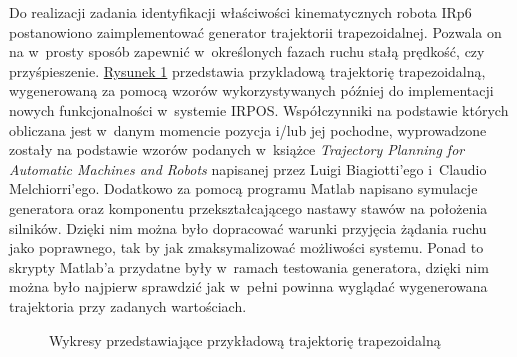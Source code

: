 \documentclass[a4paper, 12pt]{article}
\begin{document}
	Do realizacji zadania identyfikacji właściwości kinematycznych robota IRp6 postanowiono zaimplementować generator trajektorii trapezoidalnej. Pozwala on na w~prosty sposób zapewnić w~określonych fazach ruchu stałą prędkość, czy przyśpieszenie. \hyperref[fig:trajtrapez]{Rysunek 1} przedstawia przykladową trajektorię trapezoidalną, wygenerowaną za pomocą wzorów wykorzystywanych później do implementacji nowych funkcjonalności w~systemie IRPOS. Współczynniki na podstawie których obliczana jest w~danym momencie pozycja i/lub jej pochodne, wyprowadzone zostały na podstawie wzorów podanych w~książce \textit{Trajectory Planning for Automatic Machines and Robots} napisanej przez Luigi Biagiotti'ego i~Claudio Melchiorri'ego. Dodatkowo za pomocą programu Matlab napisano symulacje generatora oraz komponentu przekształcającego nastawy stawów na położenia silników. Dzięki nim można było dopracować warunki przyjęcia żądania ruchu jako poprawnego, tak by jak zmaksymalizować możliwości systemu. Ponad to skrypty Matlab'a przydatne były w~ramach testowania generatora, dzięki nim można było najpierw sprawdzić jak w~pełni powinna wyglądać wygenerowana trajektoria przy zadanych wartościach.
	\begin{figure}[H]
	\centering
	\caption{Wykresy przedstawiające przykładową trajektorię trapezoidalną}
	\label{fig:trajtrapez}
	\end{figure}
\end{document}

